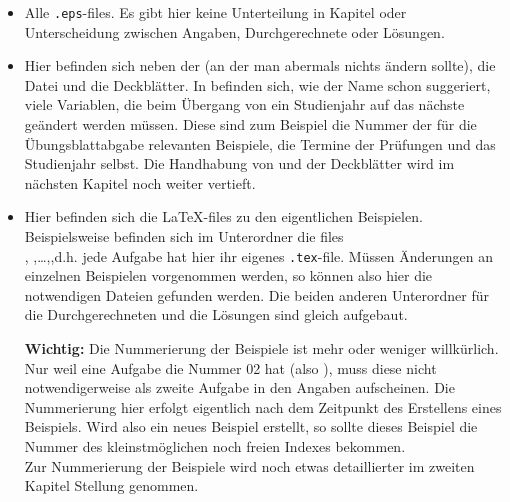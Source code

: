 \begin{itemize}
  \item {} Alle {\tt .eps}-files. Es gibt hier keine
    Unterteilung in Kapitel oder Unterscheidung zwischen Angaben,
    Durchgerechnete oder Lösungen.
  \item {} Hier befinden sich neben der 
     (an der man abermals nichts ändern sollte), die
    Datei  und die Deckblätter. In 
    befinden sich, wie der Name schon suggeriert, viele Variablen, die beim
    Übergang von ein Studienjahr auf das nächste geändert werden müssen. Diese
    sind zum Beispiel die Nummer der für die Übungsblattabgabe relevanten
    Beispiele, die Termine der Prüfungen und das Studienjahr selbst. Die
    Handhabung von  und der Deckblätter wird im nächsten
    Kapitel noch weiter vertieft.
  \item {} Hier befinden sich die \LaTeX-files zu den
    eigentlichen Beispielen. Beispielsweise befinden sich im Unterordner
     die files \\,
    ,\dots,,d.h. jede Aufgabe
    hat hier ihr eigenes {\tt .tex}-file. Müssen Änderungen an einzelnen
    Beispielen vorgenommen werden, so können also hier die notwendigen Dateien
    gefunden werden. Die beiden anderen Unterordner für die Durchgerechneten 
    und die Lösungen sind gleich aufgebaut.

    {\bf Wichtig:} Die Nummerierung der Beispiele ist mehr oder weniger
    willkürlich. Nur weil eine Aufgabe die Nummer 02 hat (also 
    ), muss diese nicht notwendigerweise als zweite
    Aufgabe in den Angaben aufscheinen. Die Nummerierung hier erfolgt eigentlich
    nach dem Zeitpunkt des Erstellens eines Beispiels. Wird also ein neues
    Beispiel erstellt, so sollte dieses Beispiel die Nummer des kleinstmöglichen
    noch freien Indexes bekommen.\\
    Zur Nummerierung der Beispiele wird noch etwas detaillierter im zweiten
    Kapitel Stellung genommen.
\end{itemize}

